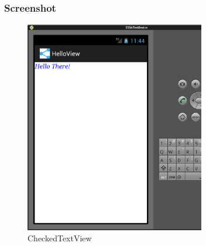 \begin{frame}
   \frametitle{Screenshot}
	\begin{figure}[h!]
	  \centering
	  \includegraphics[width=0.7\textwidth]{pictures/checked_textview.ps}
	  \caption{
		  CheckedTextView
	  }
	  \label{fig:checked_textview}
	\end{figure}
\end{frame}

